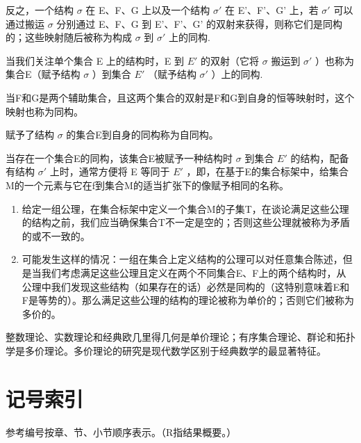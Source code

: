 反之，一个结构 \(\sigma\) 在 E、F、G 上以及一个结构 \(\sigma'\) 在 E'、F'、G' 上，若 \(\sigma'\) 可以通过搬运 \(\sigma\) 分别通过 E、F、G 到 E'、F'、G' 的双射来获得，则称它们是同构的；这些映射随后被称为构成 \(\sigma\) 到 \(\sigma'\) 上的同构.

当我们关注单个集合 E 上的结构时，E 到 \(E'\) 的双射（它将 \(\sigma\) 搬运到 \(\sigma'\) ）也称为集合E（赋予结构 \(\sigma\) ）到集合 \(E'\) （赋予结构 \(\sigma'\) ）上的同构.

当F和G是两个辅助集合，且这两个集合的双射是F和G到自身的恒等映射时，这个映射也称为同构。

赋予了结构 \(\sigma\) 的集合E到自身的同构称为自同构。

当存在一个集合E的同构，该集合E被赋予一种结构时 \(\sigma\) 到集合 \(E'\) 的结构，配备有结构 \(\sigma'\) 上时，通常方便将 E 等同于 \(E'\) ，即，在基于E的集合标架中，给集合M的一个元素与它在f到集合M的适当扩张下的像赋予相同的名称。

\begin{enumerate}
\def\labelenumi{\arabic{enumi}.}
\setcounter{enumi}{5}
\item
  给定一组公理，在集合标架中定义一个集合M的子集T，在谈论满足这些公理的结构之前，我们应当确保集合T不一定是空的；否则这些公理就被称为矛盾的或不一致的。
\item
  可能发生这样的情况：一组在集合上定义结构的公理可以对任意集合陈述，但是当我们考虑满足这些公理且定义在两个不同集合E、F上的两个结构时，从公理中我们发现这些结构（如果存在的话）必然是同构的（这特别意味着E和F是等势的）。那么满足这些公理的结构的理论被称为单价的；否则它们被称为多价的。
\end{enumerate}

整数理论、实数理论和经典欧几里得几何是单价理论；有序集合理论、群论和拓扑学是多价理论。多价理论的研究是现代数学区别于经典数学的最显著特征。

\section*{记号索引}
{}

参考编号按章、节、小节顺序表示。（R指结果概要。）

